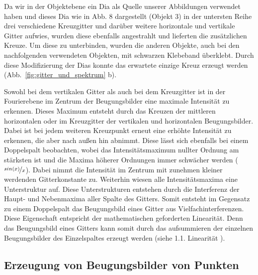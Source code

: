 Da wir in der Objektebene ein Dia als Quelle unserer Abbildungen
verwendet haben und dieses Dia wie in Abb. 8%
 dargestellt (Objekt 3) in der untersten Reihe drei verschiedene Kreuzgitter und darüber weitere horizontale und vertikale Gitter aufwies,
wurden diese ebenfalls angestrahlt und lieferten die zusätzlichen Kreuze. Um diese zu unterbinden, wurden die anderen Objekte, auch bei den nachfolgenden verwendeten Objekten, mit schwarzen Klebeband überklebt. Durch diese Modifizierung der Dias konnte das erwartete einzige Kreuz erzeugt werden (Abb.~\ref{fig:gitter_und_spektrum} b).

Sowohl bei dem vertikalen Gitter als auch bei dem Kreuzgitter ist in der Fourierebene im Zentrum der Beugungsbilder eine maximale Intensität zu erkennen. Dieses Maximum entsteht durch das Kreuzen der mittleren horizontalen oder im Kreuzgitter der vertikalen und
horizontalen Beugungsbilder. Dabei ist bei jedem weiteren Kreuzpunkt erneut eine erhöhte Intensität zu erkennen, die aber nach außen hin abnimmt. Diese lässt sich ebenfalls bei einem
Doppelspalt beobachten, wobei das Intensitätsmaximum nullter Ordnung am stärksten ist und die Maxima höherer Ordnungen immer schwächer werden ($\nicefrac{sin(x)}{x}$). Dabei nimmt die Intensität im Zentrum mit zunehmen kleiner werdenden Gitterkonstante zu.
Weiterhin wiesen alle Intensitätsmaxima eine Unterstruktur auf. Diese Unterstrukturen entstehen durch die Interferenz der Haupt- und Nebenmaxima aller Spalte des Gitters. Somit entsteht im Gegensatz zu einem Doppelspalt das Beugungsbild eines Gitter aus Vielfachinterferenzen. Diese Eigenschaft entspricht der mathematischen geforderten Linearität. Denn das Beugungsbild eines Gitters kann somit durch das aufsummieren der einzelnen Beugungsbilder des Einzelspaltes erzeugt werden (siehe 1.1. Linearität%
).

\subsection{Erzeugung von Beugungsbilder von Punkten}

